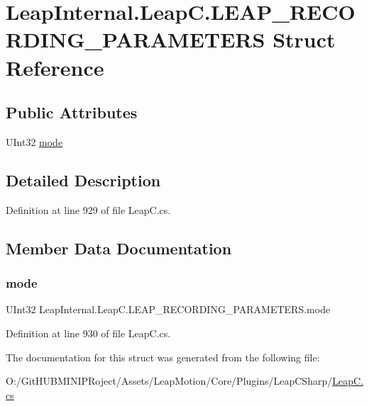 \hypertarget{struct_leap_internal_1_1_leap_c_1_1_l_e_a_p___r_e_c_o_r_d_i_n_g___p_a_r_a_m_e_t_e_r_s}{}\section{Leap\+Internal.\+Leap\+C.\+L\+E\+A\+P\+\_\+\+R\+E\+C\+O\+R\+D\+I\+N\+G\+\_\+\+P\+A\+R\+A\+M\+E\+T\+E\+RS Struct Reference}
\label{struct_leap_internal_1_1_leap_c_1_1_l_e_a_p___r_e_c_o_r_d_i_n_g___p_a_r_a_m_e_t_e_r_s}
\subsection*{Public Attributes}
\begin{DoxyCompactItemize}
\item 
U\+Int32 \mbox{\hyperlink{struct_leap_internal_1_1_leap_c_1_1_l_e_a_p___r_e_c_o_r_d_i_n_g___p_a_r_a_m_e_t_e_r_s_a5d170bce867449f5bc9b20b9bcd86030}{mode}}
\end{DoxyCompactItemize}


\subsection{Detailed Description}


Definition at line 929 of file Leap\+C.\+cs.



\subsection{Member Data Documentation}
\mbox{\label{struct_leap_internal_1_1_leap_c_1_1_l_e_a_p___r_e_c_o_r_d_i_n_g___p_a_r_a_m_e_t_e_r_s_a5d170bce867449f5bc9b20b9bcd86030}} 
\subsubsection{\texorpdfstring{mode}{mode}}
{\footnotesize\ttfamily U\+Int32 Leap\+Internal.\+Leap\+C.\+L\+E\+A\+P\+\_\+\+R\+E\+C\+O\+R\+D\+I\+N\+G\+\_\+\+P\+A\+R\+A\+M\+E\+T\+E\+R\+S.\+mode}



Definition at line 930 of file Leap\+C.\+cs.



The documentation for this struct was generated from the following file\+:\begin{DoxyCompactItemize}
\item 
O\+:/\+Git\+H\+U\+B\+M\+I\+N\+I\+P\+Roject/\+Assets/\+Leap\+Motion/\+Core/\+Plugins/\+Leap\+C\+Sharp/\mbox{\hyperlink{_leap_c_8cs}{Leap\+C.\+cs}}\end{DoxyCompactItemize}
